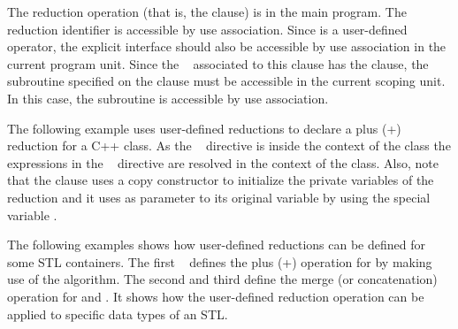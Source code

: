 The reduction operation (that is, the  clause) is in the main program.
The reduction identifier  is accessible by use association.
Since  is a user-defined operator, the explicit interface
should also be accessible by use association in the current
program unit.
Since the ~ associated to this  clause
has the  clause, the subroutine specified on the clause
must be accessible in the current scoping unit.  In this case,
the subroutine  is accessible by use association.



The following example uses user-defined reductions to declare a plus (+) reduction for a C++ class. As the ~ directive is inside the context of the  class the expressions in the ~ directive are resolved in the context of the class. Also, note that the  clause uses a copy constructor to initialize the private variables of the reduction and it uses as parameter to its original variable by using the special variable .


The following examples shows how user-defined reductions can be defined for some STL containers. The first ~ defines the plus (+) operation for  by making use of the  algorithm. The second and third define the merge (or concatenation) operation for  and . 
It shows how the user-defined reduction operation can be applied to specific data types of an STL.


